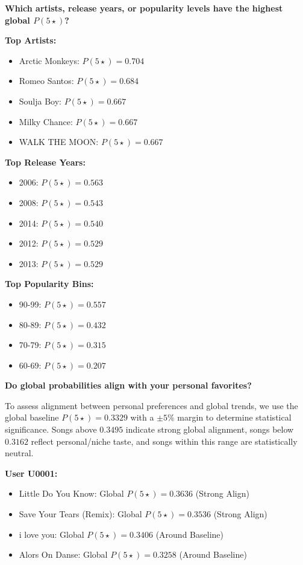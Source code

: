 \documentclass[12pt,a4paper]{article}
\begin{document}
\textbf{Which artists, release years, or popularity levels have the highest global $P(5\star)$?}

\textbf{Top Artists:}
\begin{itemize}
    \item Arctic Monkeys: $P(5\star) = 0.704$ 
    \item Romeo Santos: $P(5\star) = 0.684$ 
    \item Soulja Boy: $P(5\star) = 0.667$ 
    \item Milky Chance: $P(5\star) = 0.667$ 
    \item WALK THE MOON: $P(5\star) = 0.667$ 
\end{itemize}

\textbf{Top Release Years:}
\begin{itemize}
    \item 2006: $P(5\star) = 0.563$ 
    \item 2008: $P(5\star) = 0.543$ 
    \item 2014: $P(5\star) = 0.540$ 
    \item 2012: $P(5\star) = 0.529$ 
    \item 2013: $P(5\star) = 0.529$ 
\end{itemize}

\textbf{Top Popularity Bins:}
\begin{itemize}
    \item 90-99: $P(5\star) = 0.557$ 
    \item 80-89: $P(5\star) = 0.432$ 
    \item 70-79: $P(5\star) = 0.315$ 
    \item 60-69: $P(5\star) = 0.207$ 
\end{itemize}


\textbf{Do global probabilities align with your personal favorites?}

To assess alignment between personal preferences and global trends, we use the global baseline $P(5\star) = 0.3329$ with a $\pm 5\%$ margin to determine statistical significance. Songs above $0.3495$ indicate strong global alignment, songs below $0.3162$ reflect personal/niche taste, and songs within this range are statistically neutral.

\textbf{User U0001:}
\begin{itemize}
    \item Little Do You Know: Global $P(5\star) = 0.3636$ (Strong Align)
    \item Save Your Tears (Remix): Global $P(5\star) = 0.3536$ (Strong Align)
    \item i love you: Global $P(5\star) = 0.3406$ (Around Baseline)
    \item Alors On Danse: Global $P(5\star) = 0.3258$ (Around Baseline)
\end{itemize}
\end{document}
